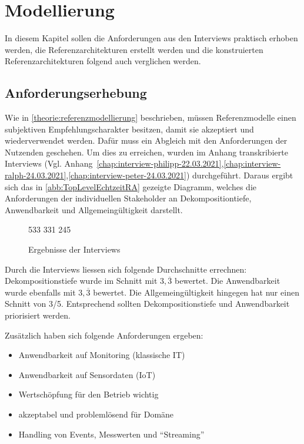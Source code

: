 \chapter{Modellierung}
In diesem Kapitel sollen die Anforderungen aus den Interviews praktisch erhoben werden, die Referenzarchitekturen erstellt werden und die konstruierten Referenzarchitekturen folgend auch verglichen werden.
\section{Anforderungserhebung}
Wie in \autoref{theorie:referenzmodellierung} beschrieben, müssen Referenzmodelle einen subjektiven Empfehlungscharakter besitzen, damit sie akzeptiert und wiederverwendet werden. Dafür muss ein Abgleich mit den Anforderungen der Nutzenden geschehen. Um dies zu erreichen, wurden im Anhang transkribierte Interviews (Vgl. Anhang~\ref{chap:interview-philipp-22.03.2021},\ref{chap:interview-ralph-24.03.2021},\ref{chap:interview-peter-24.03.2021}) durchgeführt. Daraus ergibt sich das in \autoref{abb:TopLevelEchtzeitRA} gezeigte Diagramm, welches die Anforderungen der individuellen Stakeholder an Dekompositiontiefe, Anwendbarkeit und Allgemeingültigkeit darstellt.

\begin{figure}[H]
\centering
\spideroverview
{5}{3}{3}
{3}{3}{1}
{2}{4}{5}
\caption{Ergebnisse der Interviews}
\label{abb:DimensionenUebersicht}
\end{figure}
Durch die Interviews liessen sich folgende Durchschnitte errechnen: Dekompositionstiefe wurde im Schnitt mit $3,\overline{3}$ bewertet. Die Anwendbarkeit wurde ebenfalls mit $3,\overline{3}$ bewertet. Die Allgemeingültigkeit hingegen hat nur einen Schnitt von $3$/5. Entsprechend sollten Dekompositionstiefe und Anwendbarkeit priorisiert werden.

Zusätzlich haben sich folgende Anforderungen ergeben:
\begin{itemize}
\item Anwendbarkeit auf Monitoring (klassische IT)
\item Anwendbarkeit auf Sensordaten (\ac{IoT})
\item Wertschöpfung für den Betrieb wichtig
\item akzeptabel und problemlösend für Domäne
\item Handling von Events, Messwerten und \enquote{Streaming}
\end{itemize}

